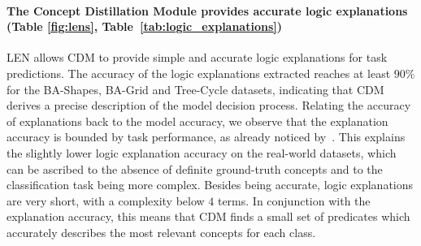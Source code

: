 \documentclass[withindex,glossary]{cam-thesis}
\theoremstyle{plain}
\theoremstyle{definition}
\theoremstyle{remark}
\begin{document}


\paragraph{The Concept Distillation Module provides accurate logic explanations (Table \ref{fig:lens}, Table~\ref{tab:logic_explanations})}
LEN allows CDM to provide simple and accurate logic explanations for task predictions. The accuracy of the logic explanations extracted reaches at least $90\%$ for the BA-Shapes, BA-Grid and Tree-Cycle datasets, indicating that CDM derives a precise description of the model decision process. Relating the accuracy of explanations back to the model accuracy, we observe that the explanation accuracy is bounded by task performance, as already noticed by~\citet{ciravegna2021logic}. This explains the slightly lower logic explanation accuracy on the real-world datasets, which can be ascribed to the absence of definite ground-truth concepts and to the classification task being more complex. Besides being accurate, logic explanations are very short, with a complexity below $4$ terms. In conjunction with the explanation accuracy, this means that CDM finds a small set of predicates which accurately describes the most relevant concepts for each class. %
\end{document}
